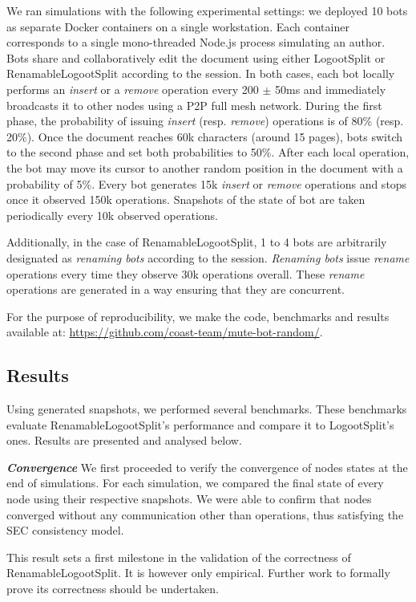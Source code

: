 \documentclass[10pt,journal,compsoc]{IEEEtran}
\newcommand{\headerparagraph}[1]{\textbf{\emph{#1}}\quad}
\begin{document}
We ran simulations with the following experimental settings: we deployed 10 bots as separate Docker containers on a single workstation.
Each container corresponds to a single mono-threaded Node.js process simulating an author.
Bots share and collaboratively edit the document using either LogootSplit or RenamableLogootSplit according to the session.
In both cases, each bot locally performs an \emph{insert} or a \emph{remove} operation every 200 $\pm$ 50ms and immediately broadcasts it to other nodes using a \ac{P2P} full mesh network.
During the first phase, the probability of issuing \emph{insert} (resp. \emph{remove}) operations is of 80\% (resp. 20\%).
Once the document reaches 60k characters (around 15 pages), bots switch to the second phase and set both probabilities to 50\%.
After each local operation, the bot may move its cursor to another random position in the document with a probability of 5\%.
Every bot generates 15k \emph{insert} or \emph{remove} operations and stops once it observed 150k operations.
Snapshots of the state of bot are taken periodically every 10k observed operations.

Additionally, in the case of RenamableLogootSplit, 1 to 4 bots are arbitrarily designated as \emph{renaming bots} according to the session.
\emph{Renaming bots} issue \emph{rename} operations every time they observe 30k operations overall.
These \emph{rename} operations are generated in a way ensuring that they are concurrent.

For the purpose of reproducibility, we make the code, benchmarks and results available at: \url{https://github.com/coast-team/mute-bot-random/}.

\subsection{Results}

Using generated snapshots, we performed several benchmarks.
These benchmarks evaluate RenamableLogootSplit's performance and compare it to LogootSplit's ones.
Results are presented and analysed below.

\headerparagraph{Convergence}
%
We first proceeded to verify the convergence of nodes states at the end of simulations.
For each simulation, we compared the final state of every node using their respective snapshots.
We were able to confirm that nodes converged without any communication other than operations, thus satisfying the \ac{SEC} consistency model.

This result sets a first milestone in the validation of the correctness of RenamableLogootSplit.
It is however only empirical.
Further work to formally prove its correctness should be undertaken.
\end{document}
